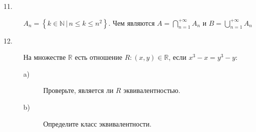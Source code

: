 \documentclass[a4paper,12pt]{article}
\theoremstyle{plain}
\theoremstyle{definition}
\theoremstyle{remark}
\begin{document}
\begin{description}
\begin{description}
\end{description}
\item[11.]
$A_n = \left\{ k \in \mathbb{N} \, | 
\, n \leq k \leq n^2 \right\}$.
Чем являются $A = \bigcap_{n=1}^{+\infty} A_n$ и
$B = \bigcup_{n=1}^{+\infty} A_n$
\item[12.]
На множестве $\mathbb{R}$ есть отношение 
$R: (x, y) \in \mathbb{R}$, если $x^3 - x = y^3 -y$:
\begin{description}
\item[a)] Проверьте, является ли $R$ эквивалентностью.
\item[b)] Определите класс эквивалентности.
\end{description}
\end{description}
\end{document}
